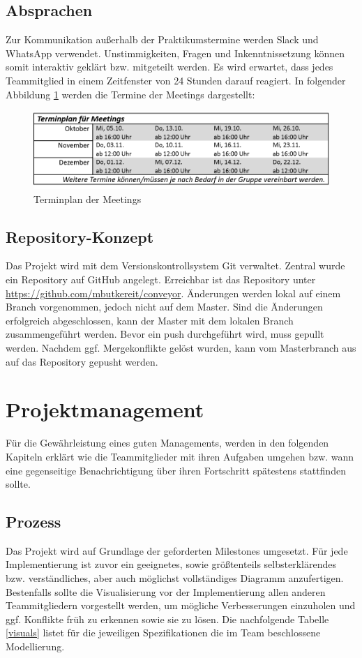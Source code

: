 \documentclass[a4paper, 11pt]{article}
\begin{document}
\subsection{Absprachen}
Zur Kommunikation außerhalb der Praktikumstermine werden Slack und WhatsApp verwendet. Unstimmigkeiten, Fragen und Inkenntnissetzung können somit interaktiv geklärt bzw. mitgeteilt werden. Es wird erwartet, dass jedes Teammitglied in einem Zeitfenster von 24 Stunden darauf reagiert. In folgender Abbildung \ref{meets} werden die Termine der Meetings dargestellt:
\begin{figure}[h]
\centering 
\includegraphics[scale=0.85]{images/Terminplan_Meetings.png}
\caption{Terminplan der Meetings}
\label{meets}
\end{figure}

\newpage

\subsection{Repository-Konzept}
Das Projekt wird mit dem Versionskontrollsystem Git verwaltet. Zentral wurde ein Repository auf GitHub angelegt. Erreichbar ist das Repository unter \url{https://github.com/mbutkereit/conveyor}. Änderungen werden lokal auf einem Branch vorgenommen, jedoch nicht auf dem Master. Sind die Änderungen erfolgreich abgeschlossen, kann der Master mit dem lokalen Branch zusammengeführt werden. Bevor ein push durchgeführt wird, muss gepullt werden. Nachdem ggf. Mergekonflikte gelöst wurden, kann vom Masterbranch aus auf das Repository gepusht werden.

\section{Projektmanagement}
Für die Gewährleistung eines guten Managements, werden in den folgenden Kapiteln erklärt wie die Teammitglieder mit ihren Aufgaben umgehen bzw. wann eine gegenseitige Benachrichtigung über ihren Fortschritt spätestens stattfinden sollte.

\subsection{Prozess}
Das Projekt wird auf Grundlage der geforderten Milestones umgesetzt. Für jede Implementierung ist zuvor ein geeignetes, sowie größtenteils selbsterklärendes bzw. verständliches, aber auch möglichst vollständiges Diagramm anzufertigen. Bestenfalls sollte die Visualisierung vor der Implementierung allen anderen Teammitgliedern vorgestellt werden, um mögliche Verbesserungen einzuholen und ggf. Konflikte früh zu erkennen sowie sie zu lösen. Die nachfolgende Tabelle \ref{visuals} listet für die jeweiligen Spezifikationen die im Team beschlossene Modellierung.
\end{document}
